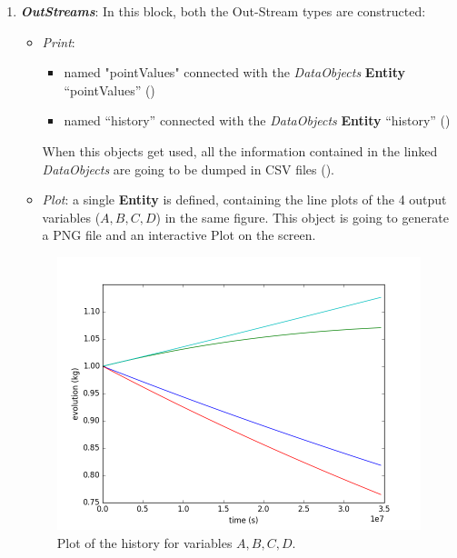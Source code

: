 \begin{enumerate}
   \item \textbf{\textit{OutStreams}}:
  In this block, both the Out-Stream types are constructed:
  \begin{itemize}
    \item \textit{Print}:
     \begin{itemize}
       \item named "pointValues" connected with the \textit{DataObjects} \textbf{Entity} ``pointValues'' ()
       \item named ``history'' connected with the \textit{DataObjects} \textbf{Entity} ``history'' ()
     \end{itemize}
      When this objects get used, all the information contained in the linked  \textit{DataObjects} are going
    to be dumped in CSV files ().
    \item \textit{Plot}: a single  \textbf{Entity} is defined, containing the line plots of the 4 output variables
    ($A,B,C,D$) in the same figure. This object is going to generate a PNG file and an interactive Plot on
    the screen.
  \end{itemize}
 \begin{figure}[h!]
  \centering
  \includegraphics[scale=0.7]{../../tests/framework/user_guide/SingleRuns/gold/singleRunPlot/1-historyPlot_line-line-line-line.png}
  \caption{Plot of the history for variables $A,B,C,D$.}
  \label{fig:historyPlotLine}
 \end{figure}
\end{enumerate}

